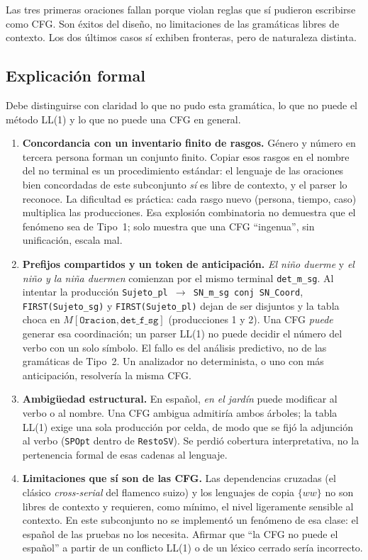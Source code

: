Las tres primeras oraciones fallan porque violan reglas que sí pudieron escribirse como CFG. Son éxitos del diseño, no limitaciones de las gramáticas libres de contexto. Los dos últimos casos sí exhiben fronteras, pero de naturaleza distinta.

\subsection{Explicación formal}
Debe distinguirse con claridad lo que no pudo esta gramática, lo que no puede el método LL(1) y lo que no puede una CFG en general.

\begin{enumerate}
    \item \textbf{Concordancia con un inventario finito de rasgos.} Género y número en tercera persona forman un conjunto finito. Copiar esos rasgos en el nombre del no terminal es un procedimiento estándar: el lenguaje de las oraciones bien concordadas de este subconjunto \emph{sí} es libre de contexto, y el parser lo reconoce. La dificultad es práctica: cada rasgo nuevo (persona, tiempo, caso) multiplica las producciones. Esa explosión combinatoria no demuestra que el fenómeno sea de Tipo~1; solo muestra que una CFG ``ingenua'', sin unificación, escala mal.

    \item \textbf{Prefijos compartidos y un token de anticipación.} \textit{El niño duerme} y \textit{el niño y la niña duermen} comienzan por el mismo terminal \texttt{det\_m\_sg}. Al intentar la producción \texttt{Sujeto\_pl $\rightarrow$ SN\_m\_sg conj SN\_Coord}, \texttt{FIRST(Sujeto\_sg)} y \texttt{FIRST(Sujeto\_pl)} dejan de ser disjuntos y la tabla choca en $M[\texttt{Oracion},\texttt{det\_f\_sg}]$ (producciones 1 y 2). Una CFG \emph{puede} generar esa coordinación; un parser LL(1) no puede decidir el número del verbo con un solo símbolo. El fallo es del análisis predictivo, no de las gramáticas de Tipo~2. Un analizador no determinista, o uno con más anticipación, resolvería la misma CFG.

    \item \textbf{Ambigüedad estructural.} En español, \textit{en el jardín} puede modificar al verbo o al nombre. Una CFG ambigua admitiría ambos árboles; la tabla LL(1) exige una sola producción por celda, de modo que se fijó la adjunción al verbo (\texttt{SPOpt} dentro de \texttt{RestoSV}). Se perdió cobertura interpretativa, no la pertenencia formal de esas cadenas al lenguaje.

    \item \textbf{Limitaciones que sí son de las CFG.} Las dependencias cruzadas (el clásico \textit{cross-serial} del flamenco suizo) y los lenguajes de copia $\{ww\}$ no son libres de contexto y requieren, como mínimo, el nivel ligeramente sensible al contexto. En este subconjunto no se implementó un fenómeno de esa clase: el español de las pruebas no los necesita. Afirmar que ``la CFG no puede el español'' a partir de un conflicto LL(1) o de un léxico cerrado sería incorrecto.
\end{enumerate}

